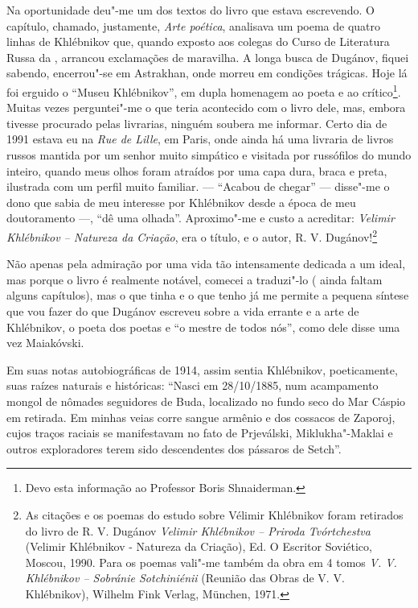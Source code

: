 Na oportunidade deu"-me um dos textos do livro que estava escrevendo. O
capítulo, chamado, justamente, \emph{Arte poética}, analisava um poema
de quatro linhas de Khlébnikov que, quando exposto aos colegas do Curso
de Literatura Russa da , arrancou exclamações de maravilha. A longa
busca de Dugánov, fiquei sabendo, encerrou"-se em Astrakhan, onde
morreu em condições trágicas. Hoje lá foi erguido o ``Museu
Khlébnikov'', em dupla homenagem ao poeta e ao crítico\footnote{Devo
  esta informação ao Professor Boris Shnaiderman.}. Muitas vezes
perguntei"-me o que teria acontecido com o livro dele, mas, embora
tivesse procurado pelas livrarias, ninguém soubera me informar. Certo
dia de 1991 estava eu na \emph{Rue de Lille}, em Paris, onde ainda há
uma livraria de livros russos mantida por um senhor muito simpático e
visitada por russófilos do mundo inteiro, quando meus olhos foram
atraídos por uma capa dura, braca e preta, ilustrada com um perfil muito
familiar. --- ``Acabou de chegar'' --- disse"-me o dono que sabia de meu
interesse por Khlébnikov desde a época de meu doutoramento ---, ``dê uma
olhada''. Aproximo"-me e custo a acreditar: \emph{Velimir Khlébnikov -- Natureza da Criação}, era o título, e o autor, R. V.
Dugánov!\footnote{As citações e os poemas do estudo sobre Vélimir
  Khlébnikov foram retirados do livro de R. V. Dugánov \emph{Velimir
  Khlébnikov -- Priroda Tvórtchestva} (Velimir Khlébnikov - Natureza da
Criação), Ed. O Escritor Soviético, Moscou, 1990. Para os poemas
  vali"-me também da obra em 4 tomos \emph{V. V. Khlébnikov --
Sobránie Sotchiniénii} (Reunião das Obras de V. V. Khlébnikov),
  Wilhelm Fink Verlag, München, 1971.}

Não apenas pela admiração por uma vida tão intensamente dedicada a um
ideal, mas porque o livro é realmente notável, comecei a traduzi"-lo (
ainda faltam alguns capítulos), mas o que tinha e o que tenho já me
permite a pequena síntese que vou fazer do que Dugánov escreveu sobre a
vida errante e a arte de Khlébnikov, o poeta dos poetas e ``o mestre de
todos nós'', como dele disse uma vez Maiakóvski.

Em suas notas autobiográficas de 1914, assim sentia Khlébnikov,
poeticamente, suas raízes naturais e históricas: ``Nasci em 28/10/1885,
num acampamento mongol de nômades seguidores de Buda, localizado no
fundo seco do Mar Cáspio em retirada. Em minhas veias corre sangue
armênio e dos cossacos de Zaporoj, cujos traços raciais se manifestavam
no fato de Prjeválski, Miklukha"-Maklai e outros exploradores terem sido
descendentes dos pássaros de Setch''.

